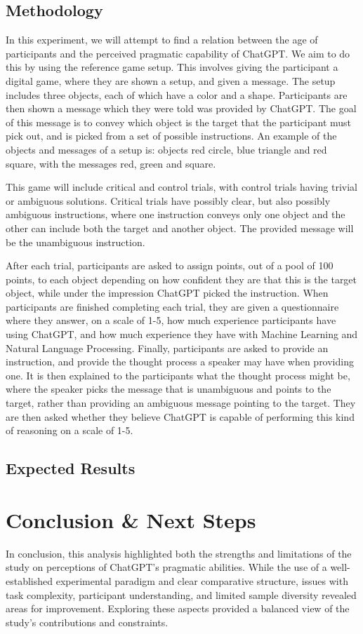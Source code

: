 \documentclass[12pt]{article}
\begin{document}
\subsection{Methodology}

In this experiment, we will attempt to find a relation between the age of participants and the perceived pragmatic capability of ChatGPT. We aim to do this by using the reference game setup. This involves giving the participant a digital game, where they are shown a setup, and given a message. The setup includes three objects, each of which have a color and a shape. Participants are then shown a message which they were told was provided by ChatGPT. The goal of this message is to convey which object is the target that the participant must pick out, and is picked from a set of possible instructions. An example of the objects and messages of a setup is: objects red circle, blue triangle and red square, with the messages red, green and square. 

This game will include critical and control trials, with control trials having trivial or ambiguous solutions. Critical trials have possibly clear, but also possibly ambiguous instructions, where one instruction conveys only one object and the other can include both the target and another object. The provided message will be the unambiguous instruction.

After each trial, participants are asked to assign points, out of a pool of 100 points, to each object depending on how confident they are that this is the target object, while under the impression ChatGPT picked the instruction. When participants are finished completing each trial, they are given a questionnaire where they answer, on a scale of 1-5, how much experience participants have using ChatGPT, and how much experience they have with Machine Learning and Natural Language Processing. Finally, participants are asked to provide an instruction, and provide the thought process a speaker may have when providing one. It is then explained to the participants what the thought process might be, where the speaker picks the message that is unambiguous and points to the target, rather than providing an ambiguous message pointing to the target. They are then asked whether they believe ChatGPT is capable of performing this kind of reasoning on a scale of 1-5.

\subsection{Expected Results}

\section{Conclusion \& Next Steps}
In conclusion, this analysis highlighted both the strengths and limitations of the study on perceptions of ChatGPT’s pragmatic abilities. While the use of a well-established experimental paradigm and clear comparative structure, issues with task complexity, participant understanding, and limited sample diversity revealed areas for improvement. Exploring these aspects provided a balanced view of the study’s contributions and constraints.

 

\end{document}
